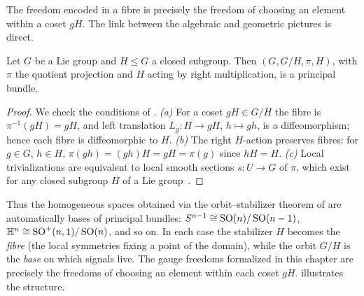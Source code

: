 The freedom encoded in a fibre is precisely the freedom of choosing an element
within a coset $gH$. The link between the algebraic and geometric pictures is
direct.

\begin{proposition}
\label{prop:gauge:homog-bundle}
Let $G$ be a Lie group and $H \le G$ a closed subgroup. Then
$(G, G/H, \pi, H)$, with $\pi$ the quotient projection and $H$ acting by right
multiplication, is a principal bundle.
\end{proposition}

\begin{proof}
We check the conditions of .
\emph{(a)} For a coset $gH \in G/H$ the fibre is $\pi^{-1}(gH) = gH$, and left
translation $L_g\colon H \to gH$, $h \mapsto gh$, is a diffeomorphism; hence each
fibre is diffeomorphic to $H$.
\emph{(b)} The right $H$-action preserves fibres: for $g \in G$, $h \in H$,
$\pi(gh) = (gh)H = gH = \pi(g)$ since $hH = H$.
\emph{(c)} Local trivializations are equivalent to local smooth sections
$s\colon U \to G$ of $\pi$, which exist for any closed subgroup $H$ of a Lie
group~\citep[Ch.~I, Prop.~5.5]{Kobayashi1996}.
\end{proof}

Thus the homogeneous spaces obtained via the orbit--stabilizer theorem of
 are automatically bases of principal bundles: $S^{n-1}
\cong \operatorname{SO}(n)/\operatorname{SO}(n-1)$, $\mathbb{H}^n \cong \operatorname{SO}^+(n,1)/\operatorname{SO}(n)$, and so on. In
each case the stabilizer $H$ becomes the \emph{fibre} (the local symmetries
fixing a point of the domain), while the orbit $G/H$ is the \emph{base} on which
signals live. The gauge freedoms formalized in this chapter are precisely the
freedoms of choosing an element within each coset $gH$. 
illustrates the structure.

